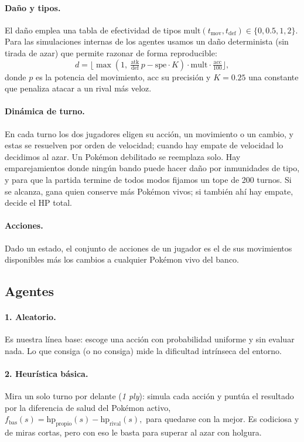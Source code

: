 \documentclass[11pt]{article}
\begin{document}
\paragraph{Daño y tipos.} El daño emplea una tabla de efectividad de tipos
$\mathrm{mult}(t_{\text{mov}},t_{\text{def}})\in\{0,0.5,1,2\}$. Para las
simulaciones internas de los agentes usamos un daño determinista (sin tirada de
azar) que permite razonar de forma reproducible:
\begin{equation}
\label{eq:dano}
d = \Big\lfloor \max(1,\ \tfrac{\text{atk}}{\text{def}}\,p - \text{spe}\cdot K)
\cdot \mathrm{mult}\cdot \tfrac{\text{acc}}{100} \Big\rfloor,
\end{equation}
donde $p$ es la potencia del movimiento, $\text{acc}$ su precisión y $K=0.25$
una constante que penaliza atacar a un rival más veloz.

\paragraph{Dinámica de turno.} En cada turno los dos jugadores eligen su acción,
un movimiento o un cambio, y estas se resuelven por orden de velocidad; cuando hay
empate de velocidad lo decidimos al azar. Un Pokémon debilitado se reemplaza solo.
Hay emparejamientos donde ningún bando puede hacer daño por inmunidades de tipo, y
para que la partida termine de todos modos fijamos un tope de 200 turnos. Si se
alcanza, gana quien conserve más Pokémon vivos; si también ahí hay empate, decide
el HP total.

\paragraph{Acciones.} Dado un estado, el conjunto de acciones de un jugador es el
de sus movimientos disponibles más los cambios a cualquier Pokémon vivo del
banco.

\subsection{Agentes}

\paragraph{1. Aleatorio.} Es nuestra línea base: escoge una acción con
probabilidad uniforme y sin evaluar nada. Lo que consiga (o no consiga) mide la
dificultad intrínseca del entorno.

\paragraph{2. Heurística básica.} Mira un solo turno por delante (\emph{1 ply}):
simula cada acción y puntúa el resultado por la diferencia de salud del Pokémon
activo,
\(
f_{\text{bas}}(s)=\text{hp}_{\text{propio}}(s)-\text{hp}_{\text{rival}}(s),
\)
para quedarse con la mejor. Es codiciosa y de miras cortas, pero con eso le basta
para superar al azar con holgura.
\end{document}
